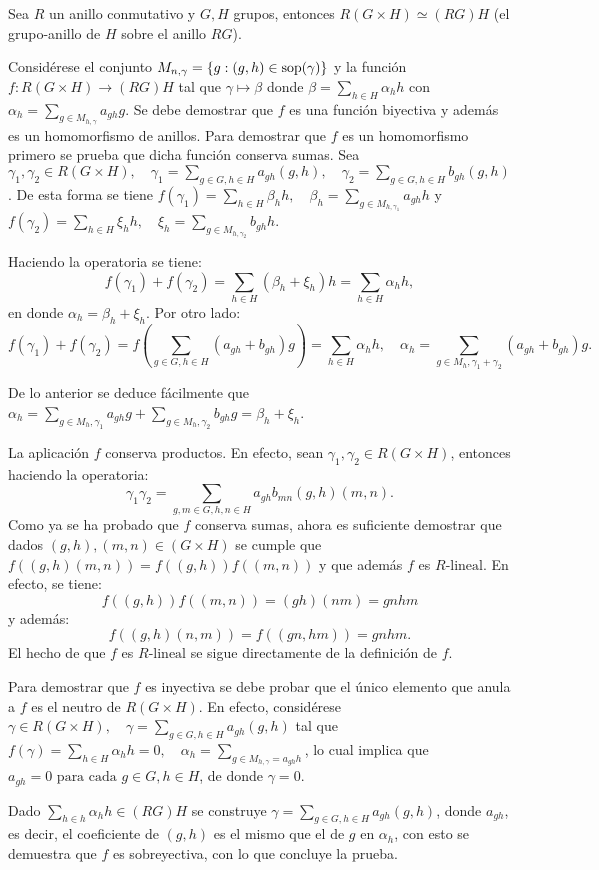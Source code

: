\begin{lema}\label{lema1}
Sea $R$ un anillo conmutativo y $G, H$ grupos, entonces $R(G \times H) \simeq (RG)H$ (el grupo-anillo de $H$ sobre el anillo $RG$).
\end{lema}
\begin{proof*}
Considérese el conjunto $M_{n,\gamma} = \{ g: (g,h) \in \operatorname{sop}(\gamma)\}$ y la función $f \colon R(G \times H) \to (RG)H$ tal que $\gamma \mapsto \beta $ donde $\beta = \sum_{h \in H} \alpha_hh $  con $\alpha_h = \sum_{g \in M_{h,\gamma}}a_{gh}g$. Se debe demostrar que $f$ es una función biyectiva y además es un homomorfismo de anillos.
Para demostrar que $f$ es un homomorfismo primero se prueba que dicha función conserva sumas.
Sea $\gamma_1, \gamma_2 \in R(G \times H),\quad \gamma_1 = \sum_{g \in G, h \in H}a_{gh}(g,h), \quad  \gamma_2 = \sum_{g\in G, h\in H}b_{gh}(g,h)$. De esta forma se tiene $f(\gamma_1) = \sum_{h \in H}\beta_hh, \quad \beta_h = \sum_{g\in M_{h,\gamma_1}}a_{gh}h$ y $f(\gamma_2) = \sum_{h\in H}\xi_hh,\quad \xi_h = \sum_{g \in M_{h,\gamma_2}}b_{gh}h$.

Haciendo la operatoria se tiene:
\[ f(\gamma_1) + f(\gamma_2) = \sum_{h\in H}(\beta_h+\xi_h)h = \sum_{h\in H}\alpha_hh,\]
en donde $\alpha_h = \beta_h + \xi_h$.
Por otro lado:
\[ f(\gamma_1) + f(\gamma_2) = f\left(\sum_{g\in G, h\in H} (a_{gh} + b_{gh})g\right) = \sum_{h \in H}\alpha_hh, \quad \alpha_h = \sum_{g \in M_h, \gamma_1 + \gamma_2}(a_{gh} + b_{gh})g.\]

De lo anterior se deduce fácilmente que $\alpha_h = \sum_{g \in M_h, \gamma_1}a_{gh}g + \sum_{g \in M_h, \gamma_2}b_{gh}g = \beta_h + \xi_h$.

La aplicación $f$ conserva productos. En efecto, sean $\gamma_1,\gamma_2 \in R(G \times H)$, entonces haciendo la operatoria:
\[\gamma_1\gamma_2 = \sum_{g,m \in G, h,n \in H} a_{gh}b_{mn}(g,h)(m,n).\]
Como ya se ha probado que $f$ conserva sumas, ahora es suficiente demostrar que dados $(g,h), (m,n) \in (G \times H)$ se cumple que $f((g,h)(m,n)) = f((g,h))f((m,n))$ y que además $f$ es $R\mbox{-lineal}$. En efecto, se tiene: 
\[ f((g,h))f((m,n)) = (gh)(nm) = gnhm  \]
y además:
\[  f((g,h)(n,m)) = f((gn,hm)) = gnhm.\]
El hecho de que $f$ es $R\mbox{-lineal}$ se sigue directamente de la definición de $f$.

Para demostrar que $f$ es inyectiva se debe probar que el único elemento que anula a $f$ es el neutro de $R(G\times H)$. En efecto, considérese $\gamma \in R(G\times H), \quad \gamma = \sum_{g \in G, h\in H}a_{gh}(g,h) $ tal que $f(\gamma) = \sum_{h \in H}\alpha_hh = 0 , \quad \alpha_h = \sum_{g \in M_{h,\gamma} = a_{gh}h}$, lo cual implica que $a_{gh} = 0 \mbox{ para cada } g \in G, h\in H$, de donde $\gamma = 0$.

Dado $\sum_{h \in h}\alpha_hh \in (RG)H$ se construye $\gamma = \sum_{g \in G, h\in H}a_{gh}(g,h)$, donde $a_{gh}$, es decir, el coeficiente de $(g,h)$ es el mismo que el de $g$ en $\alpha_h$, con esto se demuestra que $f$ es sobreyectiva, con lo que concluye la prueba. 
\qedhere
\end{proof*}

